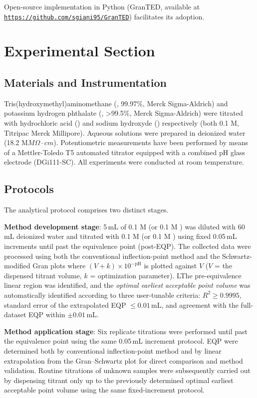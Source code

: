 \documentclass[twoside,twocolumn,9pt]{article}
\begin{document}
{Open-source implementation in Python (\textsf{GranTED}, available at \href{https://github.com/sgiani95/GranTED}{\texttt{https://github.com/sgiani95/GranTED}}) facilitates its adoption.

\section*{Experimental Section}

\subsection*{Materials and Instrumentation}

Tris(hydroxymethyl)aminomethane  (, 99.97\%, Merck Sigma-Aldrich) and potassium hydrogen phthalate (, >99.5\%, Merck Sigma-Aldrich) were titrated with hydrochloric acid () and sodium hydroxyde () respectively (both 0.1 M, Titripac Merck Millipore). Aqueous solutions were prepared in deionized water (18.2 M$M\Omega\cdot cm$). Potentiometric measurements have been performed by means of a Mettler-Toledo T5 automated titrator equipped with a combined pH glass electrode (DGi111-SC). All experiments were conducted at room temperature.

\subsection*{Protocols}

The analytical protocol comprises two distinct stages.

\textbf{Method development stage}: 5\,mL of 0.1 M  (or 0.1 M ) was diluted with 60\,mL deionized water and titrated with 0.1 M  (or 0.1 M ) using fixed 0.05\,mL increments %
until past the equivalence point (post-EQP). The collected data were processed using both the conventional inflection-point method and the Schwartz-modified Gran plots where $(V+k) \times 10^{-\mathrm{pH}}$ is plotted against $V$ ($V$ = the dispensed titrant volume, $k$ = optimization parameter). LThe pre-equivalence linear region was identified, and the \emph{optimal earliest acceptable point volume} was automatically identified according to three user-tunable criteria: $R^2 \ge 0.9995$, standard error of the extrapolated EQP $\le 0.01$\,mL, and agreement with the full-dataset EQP within $\pm 0.01$\,mL.

\textbf{Method application stage}: Six replicate titrations were performed until past the equivalence point using the same 0.05\,mL increment protocol. EQP were determined both by conventional inflection-point method and by linear extrapolation from the Gran--Schwartz plot for direct comparison and method validation. Routine titrations of unknown samples were subsequently carried out by dispensing titrant only up to the previously determined optimal earliest acceptable point volume using the same fixed-increment protocol.

}
\end{document}
